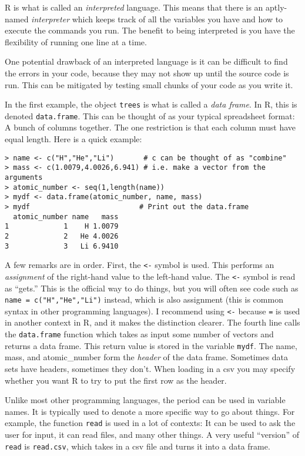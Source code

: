 \documentclass[12pt]{article}
\begin{document}
R is what is called an \emph{interpreted} language. This means that there is an aptly-named \emph{interpreter} which keeps track of all the variables you have and how to execute the commands you run. The benefit to being interpreted is you have the flexibility of running one line at a time.

One potential drawback of an interpreted language is it can be difficult to find the errors in your code, because they may not show up until the source code is run. This can be mitigated by testing small chunks of your code as you write it.

In the first example, the object \verb|trees| is what is called a \emph{data frame}. In R, this is denoted \verb|data.frame|. This can be thought of as your typical spreadsheet format: A bunch of columns together. The one restriction is that each column must have equal length. Here is a quick example:

\begin{verbatim}
> name <- c("H","He","Li")       # c can be thought of as "combine"
> mass <- c(1.0079,4.0026,6.941) # i.e. make a vector from the arguments
> atomic_number <- seq(1,length(name))
> mydf <- data.frame(atomic_number, name, mass)
> mydf                          # Print out the data.frame
  atomic_number name   mass
1             1    H 1.0079
2             2   He 4.0026
3             3   Li 6.9410
\end{verbatim}

A few remarks are in order. First, the \verb|<-| symbol is used. This performs an \emph{assignment} of the right-hand value to the left-hand value. The \verb|<-| symbol is read as ``gets.'' This is the official way to do things, but you will often see code such as \verb|name = c("H","He","Li")| instead, which is also assignment (this is common syntax in other programming languages). I recommend using \verb|<-| because \verb|=| is used in another context in R, and it makes the distinction clearer. The fourth line calls the \verb|data.frame| function which takes as input some number of vectors and returns a data frame. This return value is stored in the variable \verb|mydf|.  The name, mass, and atomic\_number form the \emph{header} of the data frame. Sometimes data sets have headers, sometimes they don't. When loading in a csv you may specify whether you want R to try to put the first row as the header.

Unlike most other programming languages, the period can be used in variable names. It is typically used to denote a more specific way to go about things. For example, the function \verb|read| is used in a lot of contexts: It can be used to ask the user for input, it can read files, and many other things. A very useful ``version'' of \verb|read| is \verb|read.csv|, which takes in a csv file and turns it into a data frame.
\end{document}
